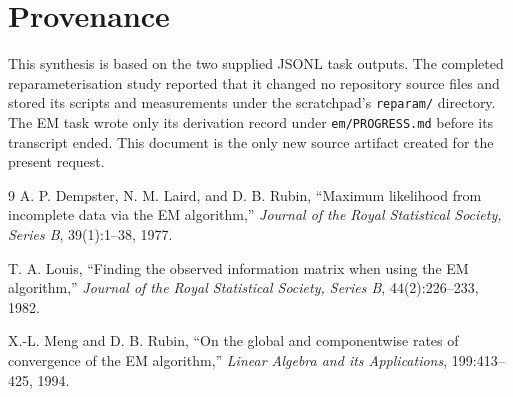 \documentclass[11pt]{article}
\begin{document}
\section*{Provenance}

This synthesis is based on the two supplied JSONL task outputs.  The completed reparameterisation
study reported that it changed no repository source files and stored its scripts and measurements
under the scratchpad's \texttt{reparam/} directory.  The EM task wrote only its derivation record
under \texttt{em/PROGRESS.md} before its transcript ended.  This document is the only new source
artifact created for the present request.

\begin{thebibliography}{9}
A. P. Dempster, N. M. Laird, and D. B. Rubin,
``Maximum likelihood from incomplete data via the EM algorithm,''
\emph{Journal of the Royal Statistical Society, Series B}, 39(1):1--38, 1977.

T. A. Louis,
``Finding the observed information matrix when using the EM algorithm,''
\emph{Journal of the Royal Statistical Society, Series B}, 44(2):226--233, 1982.

X.-L. Meng and D. B. Rubin,
``On the global and componentwise rates of convergence of the EM algorithm,''
\emph{Linear Algebra and its Applications}, 199:413--425, 1994.
\end{thebibliography}
\end{document}
